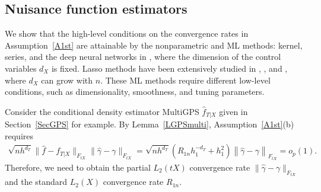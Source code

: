 \documentclass[lettersize, 12pt]{article}
\begin{document}
\subsection{Nuisance function estimators}
\label{Sec1stEst}
We show that the high-level conditions on the convergence rates in Assumption~\ref{A1st}
are attainable by the nonparametric and ML methods: kernel, series, 
and the deep neural networks in \cite{Farrell18}, where the dimension of the control variables $d_X$ is fixed.
Lasso methods have been extensively studied in \cite{SUZ}, \cite{SU_PRTE}, and \cite{SUZ_UQR}, where $d_X$ can grow with $n$.
These ML methods require different low-level conditions, such as dimensionality, smoothness, and tuning parameters.


Consider the conditional density estimator MultiGPS $\hat f_{T|X}$ given in Section~\ref{SecGPS} for example.
By Lemma~\ref{LGPSmulti}, Assumption~\ref{A1st}(b) requires 
\begin{align*}
\sqrt{nh^{d_T}}  \|\hat f - f_{T|X}\|_{F_{tX}} \|\hat\gamma-\gamma\|_{F_{tX}} =
\sqrt{nh^{d_T}} \left(  R_{1n}h_1^{-d_T} + h_1^2\right) \left\|\hat\gamma-\gamma\right\|_{F_{tX}} = o_p(1).
\end{align*}  
Therefore, we need to obtain the partial $L_2(tX)$ convergence rate $\|\hat\gamma-\gamma\|_{F_{tX}}$
and the standard $L_2(X)$ convergence rate $R_{1n}$.
\end{document}
